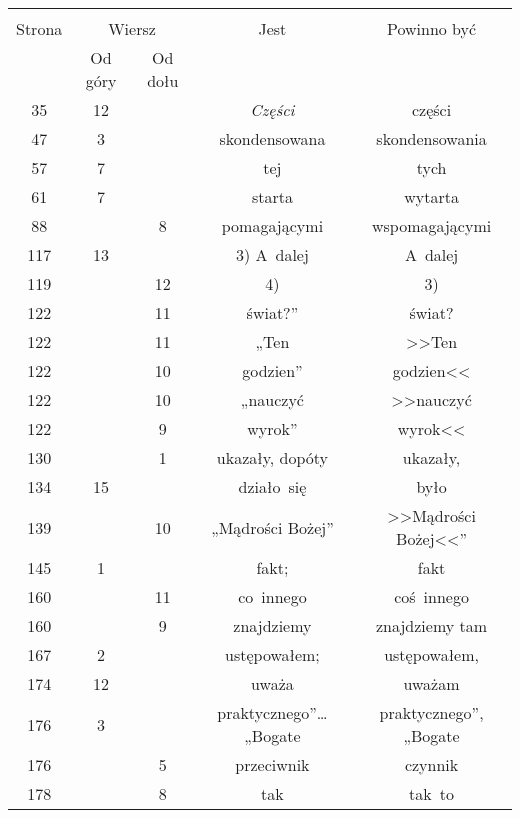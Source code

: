 \documentclass[a4paper,11pt]{article}
\begin{document}
\vspace{\spaceFour}






\begin{center}

  \begin{tabular}{|c|c|c|c|c|}
    \hline
    & \multicolumn{2}{c|}{} & & \\
    Strona & \multicolumn{2}{c|}{Wiersz} & Jest
                              & Powinno być \\ \cline{2-3}
    & Od góry & Od dołu & & \\
    \hline
    35  & 12 & & \emph{Części} & części \\
    47  &  3 & & skondensowana & skondensowania \\
    57  &  7 & & tej & tych \\
    61  &  7 & & starta & wytarta \\
    88  & &  8 & pomagającymi & wspomagającymi \\
    117 & 13 & & 3) A~dalej & A~dalej \\
    119 & & 12 & 4) & 3) \\
    122 & & 11 & świat?” & świat? \\
    122 & & 11 & „Ten & >>Ten \\
    122 & & 10 & godzien” & godzien<<  %
    \\
    122 & & 10 & „nauczyć & >>nauczyć \\
    122 & &  9 & wyrok” & wyrok<<  %
    \\
    130 & &  1 & ukazały, dopóty & ukazały, \\
    134 & 15 & & działo~się & było \\
    139 & & 10 & „Mądrości Bożej” & >>Mądrości Bożej<<”  %
    \\
    145 &  1 & & fakt; & fakt \\
    160 & & 11 & co~innego & coś~innego \\
    160 & &  9 & znajdziemy & znajdziemy tam \\
    167 &  2 & & ustępowałem; & ustępowałem, \\
    174 & 12 & & uważa & uważam \\
    176 &  3 & & praktycznego”\ldots „Bogate & praktycznego”, „Bogate \\
    176 & &  5 & przeciwnik & czynnik \\
    178 & &  8 & tak & tak~to \\

\end{tabular}
\end{center}
\end{document}
